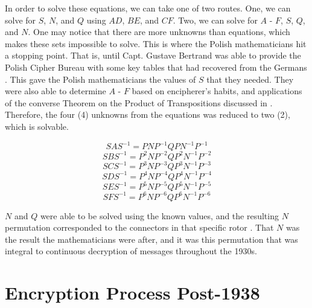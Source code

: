 In order to solve these equations, we can take one of two routes. One, we can solve for $S$, $N$, and $Q$ using $AD$, $BE$, and $CF$. Two, we can solve for $A$ - $F$, $S$, $Q$, and $N$. One may notice that there are more unknowns than equations, which makes these sets impossible to solve. This is where the Polish mathematicians hit a stopping point. That is, until Capt. Gustave Bertrand was able to provide the Polish Cipher Bureau with some key tables that had recovered from the Germans \cite{wk85}. This gave the Polish mathematicians the values of $S$ that they needed. They were also able to determine $A$ - $F$ based on encipherer's habits, and applications of the converse Theorem on the Product of Transpositions discussed in . Therefore, the four (4) unknowns from the equations was reduced to two (2), which is solvable.

$$SAS^{-1} = PNP^{-1}QPN^{-1}P^{-1}$$
$$SBS^{-1} = P^2NP^{-2}QP^2N^{-1}P^{-2}$$
$$SCS^{-1} = P^3NP^{-3}QP^3N^{-1}P^{-3}$$
$$SDS^{-1} = P^4NP^{-4}QP^4N^{-1}P^{-4}$$
$$SES^{-1} = P^5NP^{-5}QP^5N^{-1}P^{-5}$$
$$SFS^{-1} = P^6NP^{-6}QP^6N^{-1}P^{-6}$$

$N$ and $Q$ were able to be solved using the known values, and the resulting $N$ permutation corresponded to the connectors in that specific rotor \cite{wk85}. That $N$ was the result the mathematicians were after, and it was this permutation that was integral to continuous decryption of messages throughout the 1930s.

\section{Encryption Process Post-1938}

